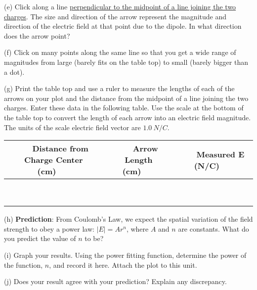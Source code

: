 (e) Click along a line \underline{perpendicular to the midpoint of a line joining the two charges}. The size and direction of the arrow represent the magnitude and direction of the electric field at that point due to the dipole.
In what direction does the arrow point?
\vspace{15mm}

(f) Click on many points along the same line so that you get a wide range of 
magnitudes from large (barely fits on the table top) to small (barely bigger 
than a dot).

(g) Print the table top and use a ruler to measure the lengths of each of the 
arrows on your plot and the distance from the midpoint of a line joining the 
two charges. Enter these data in the following table. Use the scale at the 
bottom of the table top to convert the length of each arrow into an electric 
field magnitude. The units of the scale electric field vector are $1.0 ~ N/C$.

\vspace{0.3cm}
{\centering \begin{tabular}{|c|c|c|}
\hline 
~~~Distance from Charge Center (cm)~~~&
~~~Arrow Length (cm)~~~&
~~~Measured E (N/C)~~~\\
\hline
\hline 
&
&
\\
\hline 
&
&
\\
\hline 
&
&
\\
\hline 
&
&
\\
\hline 
&
&
\\
\hline 
&
&
\\
\hline 
&
&
\\
\hline 
&
&
\\
\hline 
&
&
\\
\hline
\end{tabular}\par}
\vspace{0.3cm}


(h) \textbf{Prediction}: From Coulomb's Law, we expect the spatial variation
of the field strength to obey a power law: \( \left| E\right| =Ar^{n} \),
where \( A \) and \( n \) are constants. What do you predict the
value of \( n \) to be?\vspace{15mm}

(i) Graph your results. Using the power fitting
function, determine the power of the function, $n$, and record it here.
Attach the plot to this unit.
\vspace{15mm}

(j) Does your result agree with your prediction? Explain any discrepancy.\vspace{15mm}

